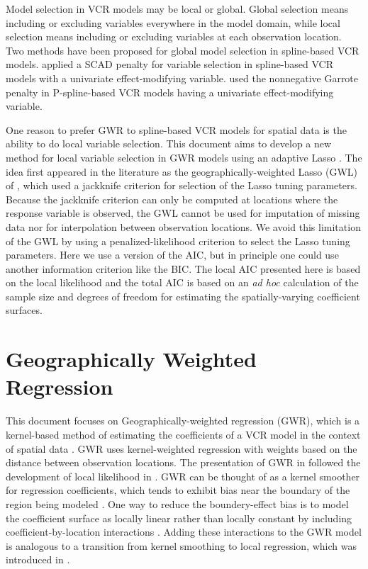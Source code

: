 \documentclass[authoryear, review, 11pt]{elsarticle}
\begin{document}
	Model selection in VCR models may be local or global. Global selection means including or excluding variables everywhere in the model domain, while local selection means including or excluding variables at each observation location. Two methods have been proposed for global model selection in spline-based VCR models. \cite{Wang:2008a} applied a SCAD penalty \citep{Fan:2001} for variable selection in spline-based VCR models with a univariate effect-modifying variable. \cite{Antoniadis:2012a} used the nonnegative Garrote penalty \citep{Breiman:1995} in P-spline-based VCR models having a univariate effect-modifying variable.

	One reason to prefer GWR to spline-based VCR models for spatial data is the ability to do local variable selection. This document aims to develop a new method for local variable selection in GWR models using an adaptive Lasso \citep{Zou:2006}. The idea first appeared in the literature as the geographically-weighted Lasso (GWL) of \cite{Wheeler:2009}, which used a jackknife criterion for selection of the Lasso tuning parameters. Because the jackknife criterion can only be computed at locations where the response variable is observed, the GWL cannot be used for imputation of missing data nor for interpolation between observation locations. We avoid this limitation of the GWL by using a penalized-likelihood criterion to select the Lasso tuning parameters. Here we use a version of the AIC, but in principle one could use another information criterion like the BIC. The local AIC presented here is based on the local likelihood \citep{Loader:1999} and the total AIC is based on an \emph{ad hoc} calculation of the sample size and degrees of freedom for estimating the spatially-varying coefficient surfaces.

\section{Geographically Weighted Regression \label{section:GWR}}
	This document focuses on Geographically-weighted regression (GWR), which is a kernel-based method of estimating the coefficients of a VCR model in the context of spatial data \citep{Brundson:1998a, Fotheringham:2002}. GWR uses kernel-weighted regression with weights based on the distance between observation locations. The presentation of GWR in \cite{Fotheringham:2002} followed the development of local likelihood in \cite{Loader:1999}. GWR can be thought of as a kernel smoother for regression coefficients, which tends to exhibit bias near the boundary of the region being modeled \citep{Hastie:1993b}. One way to reduce the boundery-effect bias is to model the coefficient surface as locally linear rather than locally constant by including coefficient-by-location interactions \citep{Hastie:1993b}. Adding these interactions to the GWR model is analogous to a transition from kernel smoothing to local regression, which was introduced in \cite{Wang:2008b}.
\end{document}
